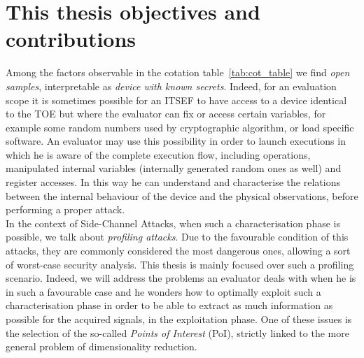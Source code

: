 \section{This thesis objectives and contributions}\label{sec:this_thesis_objectives}
Among the factors observable in the cotation table~\ref{tab:cot_table} we find \emph{open samples}, interpretable as \emph{device with known secrets}. Indeed, for an evaluation scope it is sometimes possible for an ITSEF to have access to a device identical to the TOE but where the evaluator can fix or access certain variables, for example some random numbers used by cryptographic algorithm, or load specific software. An evaluator may use this possibility in order to launch executions in which he is aware of the complete execution flow, including operations, manipulated internal variables (internally generated random ones as well) and register accesses. In this way he can understand and characterise the relations between the internal behaviour of the device and the physical observations, before performing a proper attack. \\

In the context of Side-Channel Attacks, when such a characterisation phase is possible, we talk about \emph{profiling attacks}. Due to the favourable condition of this attacks, they are commonly considered the most dangerous ones, allowing a sort of worst-case security analysis. This thesis is mainly focused over such a profiling scenario. Indeed, we will address the problems an evaluator deals with when he is in such a favourable case and he wonders how to optimally exploit such a characterisation phase in order to be able to extract as much information as possible for the acquired signals, in the exploitation phase. One of these issues is the selection of the so-called \emph{Points of Interest} (PoI), strictly linked to the more general problem of dimensionality reduction.

